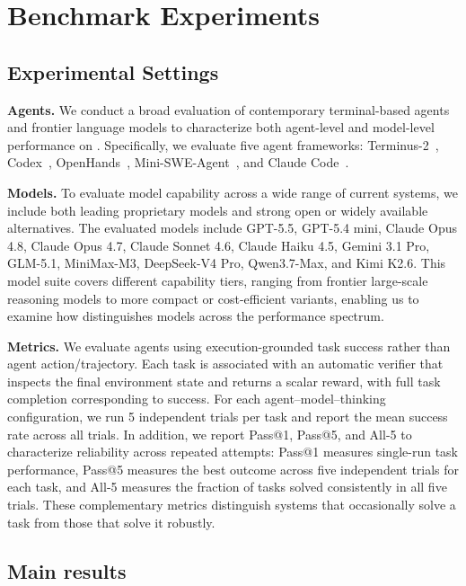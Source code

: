 \section{Benchmark Experiments}\label{sec:results}

\subsection{Experimental Settings}
\noindent\textbf{Agents.}
We conduct a broad evaluation of contemporary terminal-based agents and frontier language models to characterize both agent-level and model-level performance on \benchname. Specifically, we evaluate five agent frameworks: Terminus-2~\citep{harbor_terminus2}, Codex~\citep{openai2025codex}, OpenHands~\citep{wang2025openhands}, Mini-SWE-Agent~\citep{yang2024swe}, and Claude Code~\citep{anthropic2026claudecode}. 

\noindent\textbf{Models.}
To evaluate model capability across a wide range of current systems, we include both leading proprietary models and strong open or widely available alternatives. The evaluated models include GPT-5.5, GPT-5.4 mini, Claude Opus 4.8, Claude Opus 4.7, Claude Sonnet 4.6, Claude Haiku 4.5, Gemini 3.1 Pro, GLM-5.1, MiniMax-M3, DeepSeek-V4 Pro, Qwen3.7-Max, and Kimi K2.6. This model suite covers different capability tiers, ranging from frontier large-scale reasoning models to more compact or cost-efficient variants, enabling us to examine how \benchname distinguishes models across the performance spectrum.

\noindent\textbf{Metrics.}
We evaluate agents using execution-grounded task success rather than agent action/trajectory. Each task is associated with an automatic verifier that inspects the final environment state and returns a scalar reward, with full task completion corresponding to success. For each agent--model--thinking configuration, we run 5 independent trials per task and report the mean success rate across all trials. In addition, we report Pass@1, Pass@5, and All-5 to characterize reliability across repeated attempts: Pass@1 measures single-run task performance, Pass@5 measures the best outcome across five independent trials for each task, and All-5 measures the fraction of tasks solved consistently in all five trials. These complementary metrics distinguish systems that occasionally solve a task from those that solve it robustly.

\subsection{Main results}
\label{sec:main-results}


